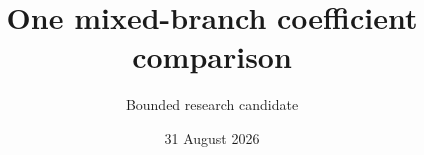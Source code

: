 \documentclass[11pt]{article}
\begin{document}
\title{One mixed-branch coefficient comparison}
\author{Bounded research candidate}
\date{31 August 2026}
\maketitle




\end{document}

